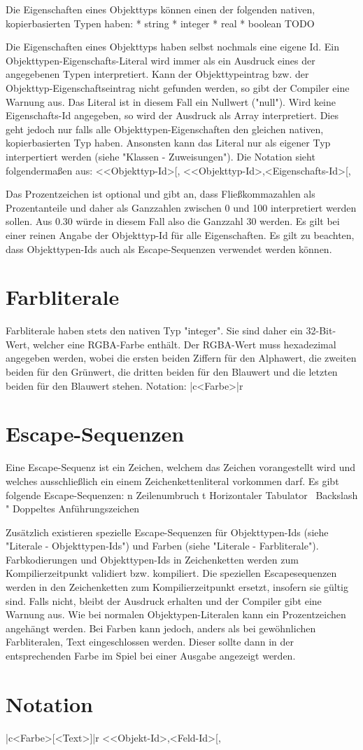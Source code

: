 Die Eigenschaften eines Objekttyps können einen der folgenden nativen, kopierbasierten Typen haben:
* string
* integer
* real
* boolean
TODO

Die Eigenschaften eines Objekttyps haben selbst nochmals eine eigene Id.
Ein Objekttypen-Eigenschafts-Literal wird immer als ein Ausdruck eines der angegebenen Typen interpretiert.
Kann der Objekttypeintrag bzw. der Objekttyp-Eigenschaftseintrag nicht gefunden werden, so gibt der Compiler eine Warnung aus.
Das Literal ist in diesem Fall ein Nullwert ("null").
Wird keine Eigenschafts-Id angegeben, so wird der Ausdruck als Array interpretiert. Dies geht jedoch nur falls alle Objekttypen-Eigenschaften
den gleichen nativen, kopierbasierten Typ haben.
Ansonsten kann das Literal nur als eigener Typ interpertiert werden (siehe "Klassen - Zuweisungen").
Die Notation sieht folgendermaßen aus:
<<Objekttyp-Id>[, %
<<Objekttyp-Id>,<Eigenschafts-Id>[, %

Das Prozentzeichen ist optional und gibt an, dass Fließkommazahlen als Prozentanteile und daher als Ganzzahlen zwischen 0 und 100 interpretiert werden
sollen. Aus 0.30 würde in diesem Fall also die Ganzzahl 30 werden.
Es gilt bei einer reinen Angabe der Objekttyp-Id für alle Eigenschaften.
Es gilt zu beachten, dass Objekttypen-Ids auch als Escape-Sequenzen verwendet werden können.

\section { Farbliterale }
Farbliterale haben stets den nativen Typ "integer". Sie sind daher ein 32-Bit-Wert, welcher eine RGBA-Farbe enthält.
Der RGBA-Wert muss hexadezimal angegeben werden, wobei die ersten beiden Ziffern für den Alphawert, die zweiten beiden für den Grünwert,
die dritten beiden für den Blauwert und die letzten beiden für den Blauwert stehen.
Notation:
|c<Farbe>|r

\section { Escape-Sequenzen }
Eine Escape-Sequenz ist ein Zeichen, welchem das \-Zeichen vorangestellt wird und welches ausschließlich ein einem
Zeichenkettenliteral vorkommen darf.
Es gibt folgende Escape-Sequenzen:
n				Zeilenumbruch
t				Horizontaler Tabulator
\				Backslash
"				Doppeltes Anführungszeichen

Zusätzlich existieren spezielle Escape-Sequenzen für Objekttypen-Ids (siehe "Literale - Objekttypen-Ids") und Farben (siehe "Literale - Farbliterale").
Farbkodierungen und Objekttypen-Ids in Zeichenketten werden zum Kompilierzeitpunkt validiert bzw. kompiliert.
Die speziellen Escapesequenzen werden in den Zeichenketten zum Kompilierzeitpunkt ersetzt, insofern sie gültig sind.
Falls nicht, bleibt der Ausdruck erhalten und der Compiler gibt eine Warnung aus.
Wie bei normalen Objektypen-Literalen kann ein Prozentzeichen angehängt werden.
Bei Farben kann jedoch, anders als bei gewöhnlichen Farbliteralen, Text eingeschlossen werden. Dieser sollte dann in der entsprechenden Farbe
im Spiel bei einer Ausgabe angezeigt werden.

\section { Notation }
|c<Farbe>[<Text>]|r
<<Objekt-Id>,<Feld-Id>[, %
